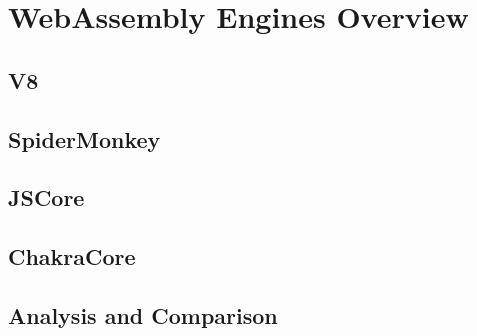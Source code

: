 \chapter{WebAssembly Engines Overview}

\section{V8}

\section{SpiderMonkey}

\section{JSCore}

\section{ChakraCore}

\section{Analysis and Comparison}
